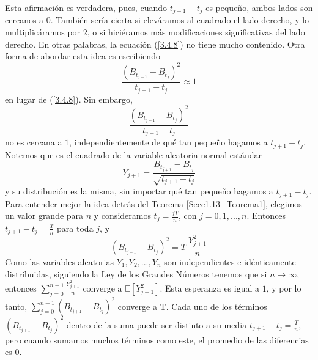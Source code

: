 \documentclass[11pt,notitlepage]{article}
\begin{document}
Esta afirmación es verdadera, pues, cuando \(t_{j+1}-t_j\) es pequeño, ambos lados son cercanos a \(0\). También sería cierta si eleváramos al cuadrado el lado derecho, y lo multiplicáramos por \(2\), o si hiciéramos más modificaciones significativas del lado derecho. En otras palabras, la ecuación (\ref{3.4.8}) no tiene mucho contenido. Otra forma de abordar esta idea es escribiendo
\begin{equation}\label{3.4.9}
    \frac{ (B_{t_{j+1}}-B_{t_j})^2}{t_{j+1}-t_j } \approx 1
\end{equation}
en lugar de (\ref{3.4.8}). Sin embargo, 
\[\frac{ (B_{t_{j+1}}-B_{t_j})^2}{t_{j+1}-t_j }\]
no es cercana a \(1\), independientemente de qué tan pequeño hagamos a \(t_{j+1}-t_j\). Notemos que es el cuadrado de la variable aleatoria normal estándar
\[Y_{j+1}=\frac{B_{t_{j+1}}-B_{t_j}}{\sqrt{t_{j+1}-t_j}}\]
y su distribución es la misma, sin importar qué tan pequeño hagamos a \(t_{j+1}-t_j\).\\

Para entender mejor la idea detrás del Teorema \ref{Secc1.13_Teorema1}, elegimos un valor grande para \(n\) y consideramos \(t_j=\frac{jT}{n}\), con \(j=0,1,...,n\). Entonces \(t_{j+1}-t_j=\frac{T}{n}\) para toda \(j\), y 
\[ (B_{t_{j+1}}-B_{t_j})^2=T~\frac{Y^2_{j+1}}{n}\]
Como las variables aleatorias \(Y_1, Y_2,...,Y_n\) son independientes e idénticamente distribuidas, siguiendo la Ley de los Grandes Números tenemos que si \(n \to \infty\), entonces \(\sum_{j=0}^{n-1}\frac{Y^2_{j+1}}{n}\) converge a \(\mathbb{E}\left[Y^2_{j+1}\right]\). Esta esperanza es igual a \(1\), y por lo tanto, \(\sum_{j=0}^{n-1}(B_{t_{j+1}}-B_{t_j})^2\) converge a T. Cada uno de los términos \((B_{t_{j+1}}-B_{t_j})^2\) dentro de la suma puede ser distinto a su media \(t_{j+1}-t_j=\frac{T}{n}\), pero cuando sumamos muchos
términos como este, el promedio de las diferencias es \(0\).\\
\end{document}
